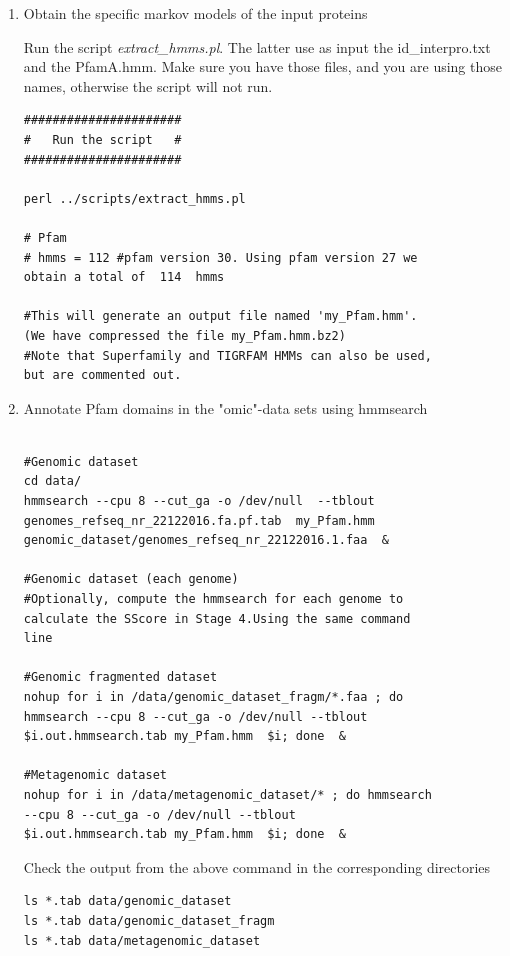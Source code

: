 \documentclass[a4paper,11pt]{report}
\begin{document}
\begin{enumerate}
\begin{verbatim}
\end{verbatim}

\item Obtain the specific markov models of the input proteins 

Run the script \textit{extract\_hmms.pl}. 
The latter use as input the  id\_interpro.txt  and the  PfamA.hmm. Make sure you have those files, and you are using those names,  otherwise the script will not run.

\begin{verbatim}
######################
#   Run the script   #
######################

perl ../scripts/extract_hmms.pl 

# Pfam
# hmms = 112 #pfam version 30. Using pfam version 27 we 
obtain a total of  114  hmms  

#This will generate an output file named 'my_Pfam.hmm'. 
(We have compressed the file my_Pfam.hmm.bz2) 
#Note that Superfamily and TIGRFAM HMMs can also be used, 
but are commented out.

\end{verbatim}

\item Annotate Pfam domains in the "omic"-data sets using hmmsearch 

\begin{verbatim}

#Genomic dataset 
cd data/
hmmsearch --cpu 8 --cut_ga -o /dev/null  --tblout 
genomes_refseq_nr_22122016.fa.pf.tab  my_Pfam.hmm 
genomic_dataset/genomes_refseq_nr_22122016.1.faa  & 

#Genomic dataset (each genome) 
#Optionally, compute the hmmsearch for each genome to 
calculate the SScore in Stage 4.Using the same command 
line  

#Genomic fragmented dataset 
nohup for i in /data/genomic_dataset_fragm/*.faa ; do 
hmmsearch --cpu 8 --cut_ga -o /dev/null --tblout 
$i.out.hmmsearch.tab my_Pfam.hmm  $i; done  & 

#Metagenomic dataset  
nohup for i in /data/metagenomic_dataset/* ; do hmmsearch 
--cpu 8 --cut_ga -o /dev/null --tblout 
$i.out.hmmsearch.tab my_Pfam.hmm  $i; done  & 
\end{verbatim}

Check the output from the above command in the corresponding directories 

\begin{verbatim}
ls *.tab data/genomic_dataset 
ls *.tab data/genomic_dataset_fragm 
ls *.tab data/metagenomic_dataset
\end{verbatim}
\end{enumerate}
\end{document}
